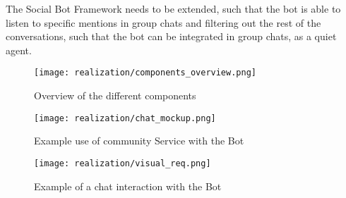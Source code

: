 The Social Bot Framework needs to be extended, such that the bot is able to listen to specific mentions in group chats and filtering out the rest of the conversations, such that the bot can be integrated in group chats, as a quiet agent.

\begin{figure}[h]
    \centering
    \texttt{[image: realization/components\_overview.png]}
    \caption{Overview of the different components}
    \label{fig:componentsOverview}
\end{figure}

\begin{figure}[h]
    \centering
    \texttt{[image: realization/chat\_mockup.png]}
    \caption{Example use of community Service with the Bot}
    \label{fig:chatMockup}
\end{figure}

\begin{figure}[h]
    \centering
    \texttt{[image: realization/visual\_req.png]}
    \caption{Example of a chat interaction with the Bot}
    \label{fig:visualReq}
\end{figure}